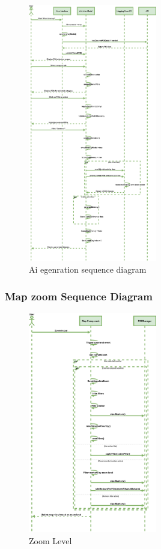 \documentclass[]{project_final}
\begin{document}
\begin{figure}[ht!]
    \centering
    \includegraphics[width=0.5\textwidth]{TPaiGenerationSequence.png}
    \vspace*{0.0cm}
    \caption{Ai egenration sequence diagram}
    \label{fig:1}
\end{figure}
\newpage
\subsubsection{Map zoom Sequence Diagram}

\begin{figure}[ht!]
    \centering
    \includegraphics[width=0.5\textwidth]{TPZoomSequenecediagram.png}
    \vspace*{0.0cm}
    \caption{Zoom Level}
    \label{fig:1}
\end{figure}
\end{document}
